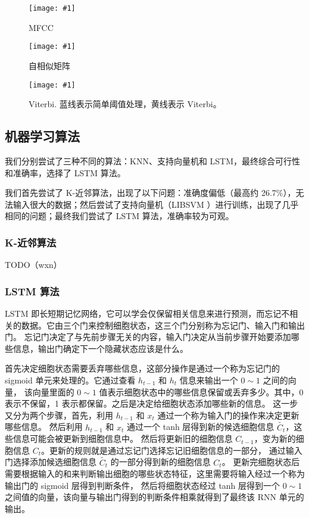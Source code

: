 \documentclass[a4paper,utf8,10pt]{article}
\newcommand{\somefigure}[4]{
  \begin{figure}[#4]
    \begin{center}
      \vspace{-10pt}
      \texttt{[image: \#1]}
      \vspace{-10pt}
      \caption{#2}
      \label{#3}
      \vspace{-10pt}
    \end{center}
  \end{figure}
}
\begin{document}
\somefigure{images/mfcc.937x400.jpg}{MFCC}{fig:mfcc}{p}
\somefigure{images/recurrence.800x400.jpg}{自相似矩阵}{fig:selfrec}{p}
\somefigure{images/viterbi.1045x308.jpg}{Viterbi. 蓝线表示简单阈值处理，黄线表示 Viterbi。}{fig:viterbi}{p}

\subsection{机器学习算法}

我们分别尝试了三种不同的算法：KNN、支持向量机和 LSTM，最终综合可行性和准确率，选择了 LSTM 算法。

我们首先尝试了 K-近邻算法，出现了以下问题：准确度偏低（最高约 26.7\%），无法输入很大的数据；然后尝试了支持向量机（LIBSVM \cite{CC01a}）进行训练，出现了几乎相同的问题；最终我们尝试了 LSTM 算法，准确率较为可观。

\subsubsection{K-近邻算法}

TODO（wxn）

\subsubsection{LSTM 算法}

LSTM 即长短期记忆网络，它可以学会仅保留相关信息来进行预测，而忘记不相关的数据。它由三个门来控制细胞状态，这三个门分别称为忘记门、输入门和输出门。
忘记门决定了与先前步骤无关的内容，输入门决定从当前步骤开始要添加哪些信息，输出门确定下一个隐藏状态应该是什么。

首先决定细胞状态需要丢弃哪些信息，这部分操作是通过一个称为忘记门的 sigmoid 单元来处理的。它通过查看 $h_{t-1}$ 和 $h_t$ 信息来输出一个 $0 \sim 1$ 之间的向量，
该向量里面的 $0 \sim 1$ 值表示细胞状态中的哪些信息保留或丢弃多少。其中，0 表示不保留，1 表示都保留。之后是决定给细胞状态添加哪些新的信息。
这一步又分为两个步骤，首先，利用 $h_{t-1}$ 和 $x_t$ 通过一个称为输入门的操作来决定更新哪些信息。
然后利用 $h_{t-1}$ 和 $x_t$ 通过一个 tanh 层得到新的候选细胞信息 $\tilde{C_t}$，这些信息可能会被更新到细胞信息中。
然后将更新旧的细胞信息 $C_{t-1}$，变为新的细胞信息 $C_t$。更新的规则就是通过忘记门选择忘记旧细胞信息的一部分，
通过输入门选择添加候选细胞信息 $\tilde{C_t}$ 的一部分得到新的细胞信息 $C_t$。
更新完细胞状态后需要根据输入的和来判断输出细胞的哪些状态特征，这里需要将输入经过一个称为输出门的 sigmoid 层得到判断条件，
然后将细胞状态经过 tanh 层得到一个 $0 \sim 1$ 之间值的向量，该向量与输出门得到的判断条件相乘就得到了最终该 RNN 单元的输出。
\end{document}
